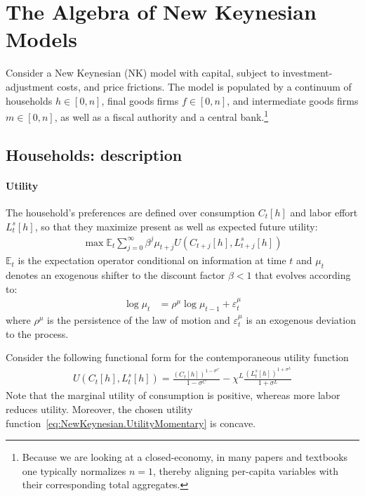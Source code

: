 \section[The Algebra of New Keynesian Models]{The Algebra of New Keynesian Models\label{ex:AlgebraNewKeynesianModels}}
Consider a New Keynesian (NK) model with capital, subject to investment-adjustment costs, and \textcite{Calvo_1983_StaggeredPricesUtilitymaximizing} price frictions.
The model is populated by a continuum of households \(h \in [0,n]\), final goods firms \(f \in [0,n]\), and intermediate goods firms \(m \in [0,n]\),
  as well as a fiscal authority and a central bank.\footnote{%
  Because we are looking at a closed-economy, in many papers and textbooks one typically normalizes \(n=1\),
    thereby aligning per-capita variables with their corresponding total aggregates.
}

\subsection{Households: description}

\paragraph{Utility}
The household's preferences are defined over consumption \(C_{t}[h]\) and labor effort \(L^{s}_t[h]\),
  so that they maximize present as well as expected future utility:
\begin{align}
	\max \mathbb{E}_{t} \sum_{j=0}^{\infty} \beta^{j} \mu_{t+j} U(C_{t+j}[h], L^{s}_{t+j}[h]) \label{eq:NewKeynesian.UtilityLifetime}
\end{align}
\(\mathbb{E}_{t}\) is the expectation operator conditional on information at time \(t\)
  and \(\mu_{t}\) denotes an exogenous shifter to the discount factor \(\beta <1\)
that evolves according to:
\begin{align}
\log{\mu_{t}} &= \rho^{\mu} \log{\mu_{t-1}} + \varepsilon^{\mu}_{t} \label{eq:NewKeynesian.LoM.PreferenceShifter}
\end{align}
where \(\rho^{\mu}\) is the persistence of the law of motion
  and \(\varepsilon^{\mu}_{t}\) is an exogenous deviation to the process.

Consider the following functional form for the contemporaneous utility function
\begin{align}
U(C_{t}[h], L^{s}_{t}[h]) = \frac{{\left(C_{t}[h]\right)}^{1-\sigma^{C}}}{1-\sigma^{C}} - \chi^{L} \frac{{\left(L^{s}_{t}[h]\right)}^{1+\sigma^{L}}}{1+\sigma^{L}} \label{eq:NewKeynesian.UtilityMomentary}
\end{align}
Note that the marginal utility of consumption is positive,
  whereas more labor reduces utility.
Moreover, the chosen utility function~\eqref{eq:NewKeynesian.UtilityMomentary} is concave.


